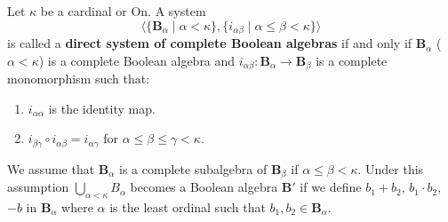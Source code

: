 Let $\kappa$ be a cardinal or $\mathrm{On}$. A system
$$\langle \{\mathbf{B}_{\alpha} \mid \alpha < \kappa\}, \{i_{\alpha\beta} \mid \alpha \leq \beta < \kappa\} \rangle$$
is called a \textbf{direct system of complete Boolean algebras} if and only if $\mathbf{B}_{\alpha}$ ($\alpha < \kappa$) is a complete Boolean algebra and $i_{\alpha\beta}: \mathbf{B}_{\alpha} \to \mathbf{B}_{\beta}$ is a complete monomorphism such that:
\begin{enumerate}
\item $i_{\alpha\alpha}$ is the identity map.
\item $i_{\beta\gamma} \circ i_{\alpha\beta} = i_{\alpha\gamma}$ for $\alpha \leq \beta \leq \gamma < \kappa$.
\end{enumerate}

We assume that $\mathbf{B}_{\alpha}$ is a complete subalgebra of $\mathbf{B}_{\beta}$ if $\alpha \leq \beta < \kappa$. Under this assumption $\bigcup_{\alpha < \kappa} B_{\alpha}$ becomes a Boolean algebra $\mathbf{B}'$ if we define $b_1 + b_2$, $b_1 \cdot b_2$, $-b$ in $\mathbf{B}_{\alpha}$ where $\alpha$ is the least ordinal such that $b_1, b_2 \in \mathbf{B}_{\alpha}$.
